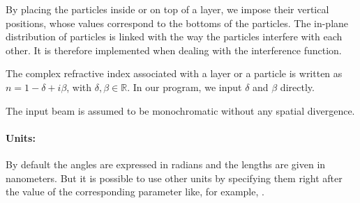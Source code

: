 By placing the particles
inside or on top of a layer, we impose their vertical positions, whose
values correspond to the bottoms of the particles. The in-plane distribution of particles is linked with the way the
particles interfere with each other. It is therefore implemented
when dealing with the interference function.


The complex refractive index associated with a layer or a particle is written as $n=1-\delta +i\beta$, with
$\delta, \beta \in \mathbb{R}$. In our program, we input $\delta$ and
$\beta$ directly.


\noindent The input beam is assumed to be monochromatic without any
spatial divergence.\\ %

\paragraph{Units:} 

By default the angles are expressed in radians and the lengths are given in
nanometers.  But it is possible to use other units by
specifying them right after the value of the corresponding
parameter like, for example, .







